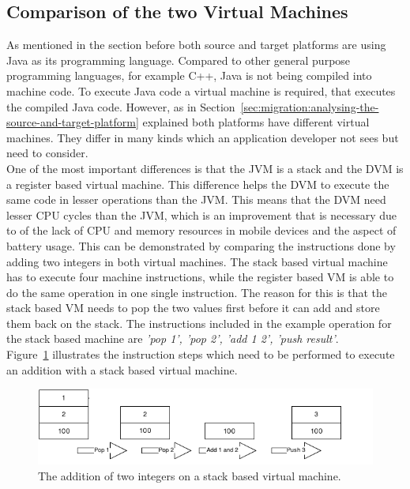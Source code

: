 \subsection{Comparison of the two Virtual Machines}
\label{sec:migration:comparison-of-the-two-virtual-machines}
As mentioned in the section before both source and target platforms are using Java as its programming language.
Compared to other general purpose programming languages, for example C++, Java is not being compiled into machine code.
To execute Java code a virtual machine is required, that executes the compiled Java code.
However, as in Section~\ref{sec:migration:analysing-the-source-and-target-platform} explained both platforms have different virtual machines.
They differ in many kinds which an application developer not sees but need to consider.
\\
One of the most important differences is that the JVM is a stack and the DVM is a register based virtual machine.
This difference helps the DVM to execute the same code in lesser operations than the JVM.
This means that the DVM need lesser CPU cycles than the JVM, which is an improvement that is necessary due to of the lack of CPU and memory resources in mobile devices and the aspect of battery usage.
This can be demonstrated by comparing the instructions done by adding two integers in both virtual machines.
The stack based virtual machine has to execute four machine instructions, while the register based VM is able to do the same operation in one single instruction.
The reason for this is that the stack based VM needs to pop the two values first before it can add and store them back on the stack.
The instructions included in the example operation for the stack based machine are \textit{'pop 1', 'pop 2', 'add 1 2', 'push result'}.\\
Figure~\ref{fig:stack-based-addition} illustrates the instruction steps which need to be performed to execute an addition with a stack based virtual machine.
\begin{figure}[h]
\begin{center}
\includegraphics[scale=0.65]{images/stack-based-addition.png} 
\caption{The addition of two integers on a stack based virtual machine.}
\label{fig:stack-based-addition}
\end{center}
\end{figure}
